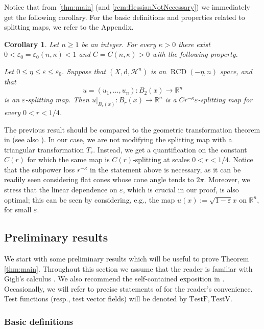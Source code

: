 \documentclass[12pt,a4paper,reqno]{amsart}
\newtheorem{corollary}[theorem]{Corollary}
\renewcommand{\leq}{\leqslant}
\renewcommand{\geq}{\geqslant}
\begin{document}
Notice that from \cref{thm:main} (and \cref{rem:HessianNotNecessary}) we immediately get the following corollary. For the basic definitions and properties related to splitting maps, we refer to the Appendix. 
\begin{corollary}\label{cor:Propagation-Splitting!}
    Let $n\geq 1$ be an integer. For every $\kappa>0$ there exist
$0<\varepsilon_0=\varepsilon_0(n,\kappa)<1$ and
$C=C(n,\kappa)>0$ with the following property. 

Let $0\leq \eta\leq \varepsilon\leq\varepsilon_0$. Suppose that
$(X,\mathrm d,\mathcal H^n)$ is an $\operatorname{RCD}(-\eta,n)$ space, and that
\[
u=(u_1,\ldots,u_n):B_2(x)\to\mathbb R^n
\]
is an $\varepsilon$-splitting map. Then $u\big|_{B_r(x)}:B_r(x)\to\mathbb R^n$
is a $Cr^{-\kappa}\varepsilon$-splitting map for every
$0<r<1/4$.
\end{corollary}
The previous result should be compared to the geometric transformation theorem in \cite[Theorem 7.2]{ChJiNa} (see also \cite[Proposition 3.13]{BNSInv}). In our case, we are not modifying the splitting map with a triangular transformation $T_r$. Instead, we get a quantification on the constant $C(r)$ for which the same map is $C(r)$-splitting at scales $0<r<1/4$. Notice that the subpower loss $r^{-\kappa}$ in the statement above is necessary, as it can be readily seen considering flat cones whose cone angle tends to $2\pi$. Moreover, we stress that the linear dependence on $\varepsilon$, which is crucial in our proof, is also optimal; this can be seen by considering, e.g., the map $u(x):=\sqrt{1-\varepsilon}x$ on $\mathbb R^n$, for small $\varepsilon$.




\subsection{Preliminary results}

We start with some preliminary results which will be useful to prove Theorem \ref{thm:main}. Throughout this section we assume that the reader is familiar with Gigli's calculus \cite{GigliNDG}. We also recommend the self-contained exposition in \cite[Section 2.1 and 2.2]{GigliViolo}. Occasionally, we will refer to precise statements of \cite{GigliNDG, GigliViolo} for the reader's convenience. Test functions (resp., test vector fields) will be denoted by $\mathrm{TestF},\mathrm{TestV}$.

\subsubsection{Basic definitions}
\end{document}
